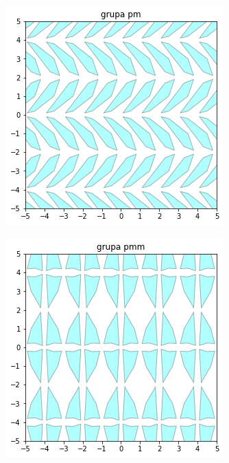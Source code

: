 \documentclass[11pt]{article}
\begin{document}
\begin{figure}[H]
\begin{subfigure}[b]{0.22\textwidth}
    \label{fig:f11}
  \end{subfigure}
  \begin{subfigure}[b]{0.22\textwidth}
    \includegraphics[width=\textwidth]{output_87_3.png}
    \label{fig:f12}
   \end{subfigure} 
   \begin{subfigure}[b]{0.22\textwidth}
    \includegraphics[width=\textwidth]{output_87_4.png}
    \label{fig:f13}
  \end{subfigure}
\end{figure}
\end{document}

